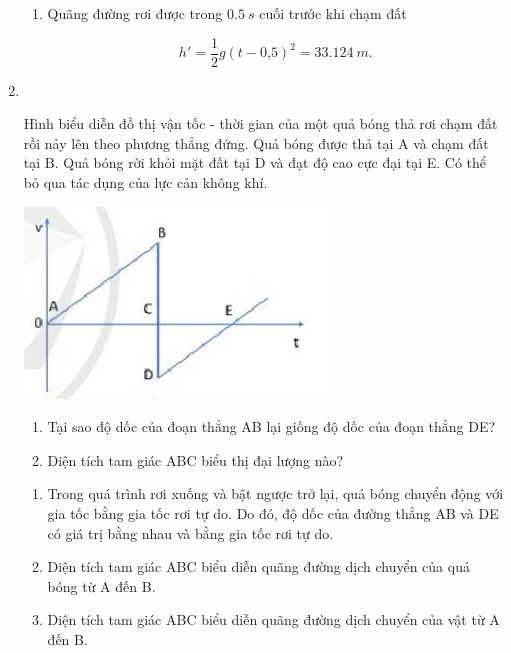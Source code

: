 \begin{enumerate}[label=\bfseries Bài \arabic*:]
{\begin{enumerate}[label=\alph*)]
		$$h = \dfrac{1}{2}gt^2 = \SI{47,089}{m}.$$
		
		Vận tốc lúc chạm đất
		
		$$ v = gt = \SI{30,38}{m/s}.$$
		
		\item Quãng đường rơi được trong $\SI{0,5}{s}$ cuối trước khi chạm đất
		
		$$h' = \dfrac{1}{2} g(t - \text{0,5})^2 = \SI{33,124}{m}.$$
	\end{enumerate}
}

\item {}\\
{Hình biểu diễn đồ thị vận tốc - thời gian của một quả bóng thả rơi chạm đất rồi nảy lên theo phương thẳng đứng. Quả bóng được thả tại A và chạm đất tại B. Quả bóng rời khỏi mặt đất tại D và đạt độ cao cực đại tại E. Có thể bỏ qua tác dụng của lực cản không khí.
	\begin{center}
		\includegraphics[scale=1]{../figs/VN10-2022-PH-TP012-6.jpg}
	\end{center}
	
	\begin{enumerate}[label=\alph*)]
		\item Tại sao độ dốc của đoạn thẳng AB lại giống độ dốc của đoạn thẳng DE?
		\item Diện tích tam giác ABC biểu thị đại lượng nào?
	\end{enumerate}
}

\hideall
{	
	\begin{enumerate}[label=\alph*)]
		\item Trong quá trình rơi xuống và bật ngược trở lại, quả bóng chuyển động với gia tốc bằng gia tốc rơi tự do. Do đó, độ dốc của đường thẳng AB và DE có giá trị bằng nhau và bằng gia tốc rơi tự do.
		
		
		\item Diện tích tam giác ABC biểu diễn quãng đường dịch chuyển của quả bóng từ A đến B.
		
		
		\item Diện tích tam giác ABC biểu diễn quãng đường dịch chuyển của vật từ A đến B.
		
		
	\end{enumerate}
}
\end{enumerate}

